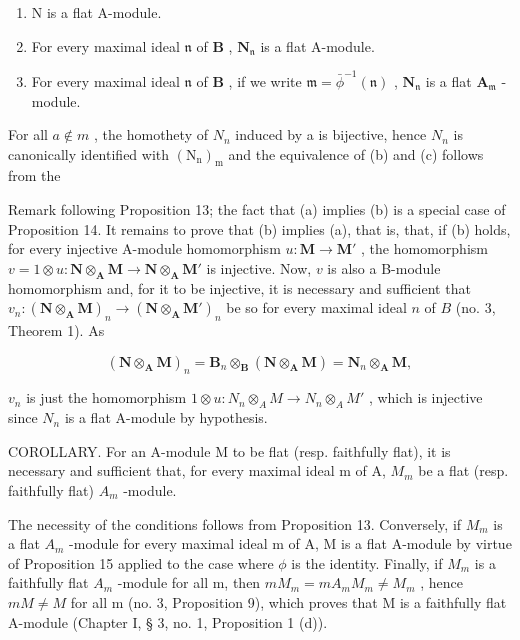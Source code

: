 \begin{enumerate}
\def\labelenumi{(\alph{enumi})}
\item
  N is a flat A-module.
\item
  For every maximal ideal \(\mathfrak{n}\) of \(\mathbf{B}\) , \(\mathbf{N}_{\mathfrak{n}}\) is a flat A-module.
\item
  For every maximal ideal \(\mathfrak{n}\) of \(\mathbf{B}\) , if we write \(\mathfrak{m} = \bar{\phi}^{-1}(\mathfrak{n})\) , \(\mathbf{N}_{\mathfrak{n}}\) is a flat \(\mathbf{A}_{\mathfrak{m}}\) -module.
\end{enumerate}

For all \(a \notin m\) , the homothety of \(N_{n}\) induced by a is bijective, hence \(N_{n}\) is canonically identified with \((\mathrm{N}_{\mathrm{n}})_{\mathrm{m}}\) and the equivalence of (b) and (c) follows from the

Remark following Proposition 13; the fact that (a) implies (b) is a special case of Proposition 14. It remains to prove that (b) implies (a), that is, that, if (b) holds, for every injective A-module homomorphism \(u: \mathbf{M} \to \mathbf{M}'\) , the homomorphism \(v = 1 \otimes u: \mathbf{N} \otimes_{\mathbf{A}} \mathbf{M} \to \mathbf{N} \otimes_{\mathbf{A}} \mathbf{M}'\) is injective. Now, \(v\) is also a B-module homomorphism and, for it to be injective, it is necessary and sufficient that \(v_n: (\mathbf{N} \otimes_{\mathbf{A}} \mathbf{M})_n \to (\mathbf{N} \otimes_{\mathbf{A}} \mathbf{M}')_n\) be so for every maximal ideal \(n\) of \(B\) (no. 3, Theorem 1). As

\[
(\mathbf {N} \otimes_ {\mathbf {A}} \mathbf {M}) _ {n} = \mathbf {B} _ {n} \otimes_ {\mathbf {B}} (\mathbf {N} \otimes_ {\mathbf {A}} \mathbf {M}) = \mathbf {N} _ {n} \otimes_ {\mathbf {A}} \mathbf {M},
\]

\(v_{n}\) is just the homomorphism \(1 \otimes u: N_{n} \otimes_{A} M \to N_{n} \otimes_{A} M'\) , which is injective since \(N_{n}\) is a flat A-module by hypothesis.

COROLLARY. For an A-module M to be flat (resp. faithfully flat), it is necessary and sufficient that, for every maximal ideal m of A, \(M_{m}\) be a flat (resp. faithfully flat) \(A_{m}\) -module.

The necessity of the conditions follows from Proposition 13. Conversely, if \(M_{m}\) is a flat \(A_{m}\) -module for every maximal ideal m of A, M is a flat A-module by virtue of Proposition 15 applied to the case where \(\phi\) is the identity. Finally, if \(M_{m}\) is a faithfully flat \(A_{m}\) -module for all m, then \(mM_{m} = mA_{m}M_{m} \neq M_{m}\) , hence \(mM \neq M\) for all m (no. 3, Proposition 9), which proves that M is a faithfully flat A-module (Chapter I, § 3, no. 1, Proposition 1 (d)).

